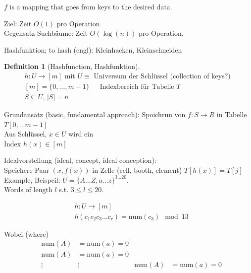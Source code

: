 \documentclass[10pt]{amsart}
\newtheorem{definition}{Definition}
\begin{document}
\begin{multicols*}{2}
$f$ is a mapping that goes from keys to the desired data.

Ziel: Zeit $O(1)$ pro Operation \\

Gegensatz Suchb\"{a}ume: Zeit $O(\log{(n)})$ pro Operation.

Hashfunktion; to hash (engl): Kleinhacken, Kleinschneiden
\begin{definition}[Hashfunction, Hashfunktion]
\begin{equation}
\begin{gathered} 
h: U \to [m ] \text{ mit } 
U \equiv \text{ Universum der Schl\"{u}ssel  (collection of keys?) } \\
[m] = \lbrace 0 , \dots , m-1 \rbrace \quad \, \text{ Indexbereich f\"{u}r Tabelle } T \\
S \subseteq U, \, |S| = n
\end{gathered} 
\end{equation}
\end{definition}


Grundansatz (basic, fundamental approach): Spoichrun von $f: S \to R$ in Tabelle $T[0, \dots m-1]$ \\

Aus Schl\"{u}ssel, $x\in U$ wird ein \\
Index $h(x) \in [m]$

Idealvorstellung (ideal, concept, ideal conception): \\
Speichere Paar $(x, f(x))$ in Zelle (cell, booth, element) $T[h(x)] = T[j]$ \\

Example, Beispeil: $U = \lbrace A \dots Z, a\dots z \rbrace^{3 \dots 20}$. \\
Words of length $l$ s.t. $3\leq l \leq 20$.

\[
\begin{aligned}
& h : U \to [m] \\
& h(c_1c_2 c_3 \dots c_r) = \text{num}(c_3) \mod{ 13}
\end{aligned}
\]

Wobei (where) 
\[
\begin{aligned}
& \text{num}{(A)} &= \text{num}{(a)} = 0 \\
& \text{num}{(A)} &= \text{num}{(a)} = 0 \\
& \vdots & \vdots 
& \text{num}{(A)} &= \text{num}{(a)} = 0 
\end{aligned}
\]


\end{multicols*}
\end{document}
